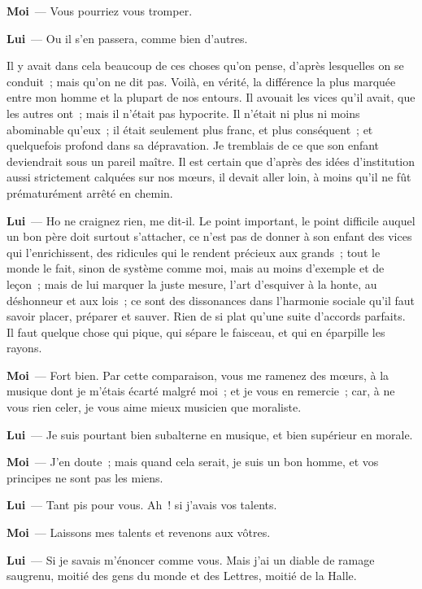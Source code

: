 \documentclass[french,twoside]{book} %
\newcommand{\labelchar}[1]{\textbf{\color{rubric} #1}}
\begin{document}
\labelchar{Moi} — Vous pourriez vous tromper.\par
\labelchar{Lui} — Ou il s’en passera, comme bien d’autres.\par
Il y avait dans cela beaucoup de ces choses qu’on pense, d’après lesquelles on se conduit ; mais qu’on ne dit pas. Voilà, en vérité, la différence la plus marquée entre mon homme et la plupart de nos entours. Il avouait les vices qu’il avait, que les autres ont ; mais il n’était pas hypocrite. Il n’était ni plus ni moins abominable qu’eux ; il était seulement plus franc, et plus conséquent ; et quelquefois profond dans sa dépravation. Je tremblais de ce que son enfant deviendrait sous un pareil maître. Il est certain que d’après des idées d’institution aussi strictement calquées sur nos mœurs, il devait aller loin, à moins qu’il ne fût prématurément arrêté en chemin.\par
\labelchar{Lui} — Ho ne craignez rien, me dit-il. Le point important, le point difficile auquel un bon père doit surtout s’attacher, ce n’est pas de donner à son enfant des vices qui l’enrichissent, des ridicules qui le rendent précieux aux grands ; tout le monde le fait, sinon de système comme moi, mais au moins d’exemple et de leçon ; mais de lui marquer la juste mesure, l’art d’esquiver à la honte, au déshonneur et aux lois ; ce sont des dissonances dans l’harmonie sociale qu’il faut savoir placer, préparer et sauver. Rien de si plat qu’une suite d’accords parfaits. Il faut quelque chose qui pique, qui sépare le faisceau, et qui en éparpille les rayons.\par
\labelchar{Moi} — Fort bien. Par cette comparaison, vous me ramenez des mœurs, à la musique dont je m’étais écarté malgré moi ; et je vous en remercie ; car, à ne vous rien celer, je vous aime mieux musicien que moraliste.\par
\labelchar{Lui} — Je suis pourtant bien subalterne en musique, et bien supérieur en morale.\par
\labelchar{Moi} — J’en doute ; mais quand cela serait, je suis un bon homme, et vos principes ne sont pas les miens.\par
\labelchar{Lui} — Tant pis pour vous. Ah ! si j’avais vos talents.\par
\labelchar{Moi} — Laissons mes talents et revenons aux vôtres.\par
\labelchar{Lui} — Si je savais m’énoncer comme vous. Mais j’ai un diable de ramage saugrenu, moitié des gens du monde et des Lettres, moitié de la Halle.\par
\end{document}
